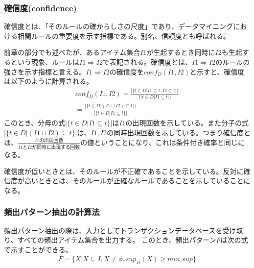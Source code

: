 \documentclass[dvipdfmx]{jsarticle}
\begin{document}
\subsubsection{確信度(confidence)}
確信度とは、「そのルールの確からしさの尺度」であり、データマイニングにおける相関ルールの重要度を示す指標である。別名、信頼度とも呼ばれる。\par
前章の部分でも述べたが、あるアイテム集合$I1$が生起するとき同時に$I2$も生起するという現象、ルールは$I1 \Rightarrow I2$で表記される。確信度とは、$I1 \Rightarrow I2$のルールの強さを示す指標と言える。$I1 \Rightarrow I2$の確信度を$conf_{D}(I1, I2)$と示すと、確信度は以下のように計算される。
\begin{gather*}
  conf_{D}(I1, I2) = \frac{|\{t \in D|I1 \subseteq t, I2 \subseteq t|\}}{\{|t \in D | I1 \subseteq t|\}}\\
  =\frac{|\{t \in D | (I1 \cup I2) \subseteq t\}|}{|\{t \in D | I1 \subseteq t\}|}
\end{gather*}
このとき、分母の式$|\{t \in D | I1 \subseteq t\}|$は$I1$の出現回数を示している。また分子の式$|\{t \in D | (I1 \cup I2) \subseteq t\}|$は、$I1, I2$の同時出現回数を示している。つまり確信度とは、$\frac{I1の出現回数}{I1とI2が同時に出現する回数}$の値ということになり、これは条件付き確率と同じになる。\par
確信度が低いときとは、そのルールが不正確であることを示している。反対に確信度が高いときとは、そのルールが正確なルールであることを示していることになる。
\subsubsection{頻出パターン抽出の計算法}
頻出パターン抽出の際は、入力としてトランザクションデータベースを受け取り、すべての頻出アイテム集合を出力する。
このとき、頻出パターン$F$は次の式で示すことができる。
\begin{gather*}
  F = \{X | X \subseteq I, X \neq \phi, sup_{D}(X) \ge min\_sup \}
\end{gather*}
\end{document}
